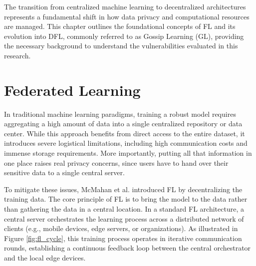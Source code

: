 The transition from centralized machine learning to decentralized architectures represents a fundamental shift in how data privacy and computational resources are managed. This chapter outlines the foundational concepts of FL and its evolution into DFL, commonly referred to as Gossip Learning (GL), providing the necessary background to understand the vulnerabilities evaluated in this research.

\section{Federated Learning}

In traditional machine learning paradigms, training a robust model requires aggregating a high amount of data into a single centralized repository or data center. While this approach benefits from direct access to the entire dataset, it introduces severe logistical limitations, including high communication costs and immense storage requirements. More importantly, putting all that information in one place raises real privacy concerns, since users have to hand over their sensitive data to a single central server.

To mitigate these issues, McMahan et al. \cite{mcmahan2017communication} introduced FL by decentralizing the training data. The core principle of FL is to bring the model to the data rather than gathering the data in a central location. In a standard FL architecture, a central server orchestrates the learning process across a distributed network of clients (e.g., mobile devices, edge servers, or organizations). As illustrated in Figure \ref{fig:fl_cycle}, this training process operates in iterative communication rounds, establishing a continuous feedback loop between the central orchestrator and the local edge devices.

